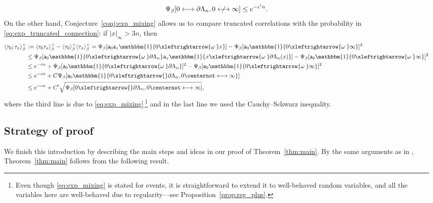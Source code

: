 \documentclass[11pt,a4paper]{article}
\numberwithin{equation}{section}
\theoremstyle{plain}
\theoremstyle{definition}
\newcommand{\connect}{\xleftrightarrow}
\begin{document}
\begin{equation}\label{eq:exp_truncated_connection}
    \Psi_\beta[0\longleftrightarrow \partial \Lambda_n, 0\centernot\longleftrightarrow \infty]\leq e^{-c'n}.
\end{equation}
On the other hand, Conjecture~\ref{conj:exp_mixing} allows us to compare truncated correlations with the probability in \eqref{eq:exp_truncated_connection}: if $|x|_\infty>3n$, then 
\begin{align*}
    \langle \tau_0 ; \tau_x \rangle_\beta^+ 
    &:= \langle \tau_0 \tau_x \rangle_\beta^+ - \langle \tau_0 \rangle_\beta^+\langle \tau_x \rangle_\beta^+ 
    = \Psi_\beta[ \mathsf{a}_0 \mathsf{a}_x \mathbbm{1}\{0 \connect{\omega\:} x\}] - \Psi_\beta[\mathsf{a}_0 \mathbbm{1}\{0 \connect{\omega\:} \infty\}]^2 \\
    &\leq \Psi_\beta[\mathsf{a}_0 \mathbbm{1}\{0 \connect{\omega\:} \partial \Lambda_n\} \mathsf{a}_x \mathbbm{1}\{x \connect{\omega\:} \partial \Lambda_n(x)\}] - \Psi_\beta[\mathsf{a}_0 \mathbbm{1}\{0 \connect{\omega\:} \infty\}]^2 \\
    &\leq e^{-cn} + \Psi_\beta[\mathsf{a}_0 \mathbbm{1}\{0 \connect{\omega\:} \partial \Lambda_n\}]^2 - \Psi_\beta[\mathsf{a}_0 \mathbbm{1}\{0 \connect{\omega\:} \infty\}]^2 \\
    &\leq e^{-cn} + C\Psi_\beta[ \mathsf{a}_0 \mathbbm{1}\{0 \connect{} \partial \Lambda_n, 0\centernot\longleftrightarrow \infty \} ] \\
    &\leq e^{-cn} + C' \sqrt{\Psi_\beta[ 0 \connect{} \partial \Lambda_n, 0\centernot\longleftrightarrow \infty ]},
\end{align*}
where the third line is due to \eqref{eq:exp_mixing}\,\footnote{Even though \eqref{eq:exp_mixing} is stated for events, it is straightforward to extend it to well-behaved random variables, and all the variables here are well-behaved due to regularity---see Proposition~\ref{prop:reg_plus}.} and in the last line we used the Cauchy–Schwarz inequality.




\subsection{Strategy of proof}

We finish this introduction by describing the main steps and ideas in our proof of Theorem~\ref{thm:main}. By the same arguments as in \cite[Section 6]{gunaratnam2025supercritical}, Theorem~\ref{thm:main} follows from the following result.
\end{document}
